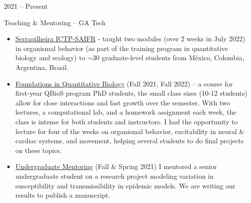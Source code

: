 \documentclass[a4paper,10pt]{article}
\newlength{\cvcolumngapwidth}
\newlength{\cvleftcolumnwidth}
\newlength{\cvrightcolumnwidth}
\newcommand{\cvtitlestyle}[1]{{\large\cvtitlefont\textcolor{cvtitlecolor}{#1}}}
\newcommand{\cvheadingstyle}[1]{{\normalsize\cvheadingfont\textcolor{cvheadingcolor}{#1}}}
\newlength{\cvafteritemskipamount}
\newlength{\cvaftertitleskipamount}
\newlength{\cvparskip}
\newcommand{\cvitem}[2]{
            \begin{minipage}[t]{\cvleftcolumnwidth}
                \raggedleft #1
            \end{minipage}%
            \hspace{\cvcolumngapwidth}%
            \begin{minipage}[t]{\cvrightcolumnwidth}
                \setlength{\parskip}{\cvparskip} #2
            \end{minipage}
        
            \vspace{\cvafteritemskipamount}
        }
\newcommand{\cvtitle}[1]{
            \cvtitlestyle{#1}
        
            \vspace{\cvaftertitleskipamount}
            \vspace{-\cvparskip}
        }
\begin{document}
	\cvitem{
            \cvheadingstyle{2021 -- Present}
        }{
            \cvtitle{Teaching \& Mentoring -- GA Tech}
            \begin{itemize}[leftmargin=*]
            	\item \href{https://docs.google.com/spreadsheets/d/1vShFs_Td_geBw8N3Ll6b7dOMDl3bdHjoqBhE8TupWd4/edit?usp=sharing}{\underline{Serrapilheira ICTP-SAIFR}} -  taught two modules (over 2 weeks in July 2022) in organismal behavior (as part of the training program in quantitative biology and ecology) to $\sim$30 graduate-level students from M\'exico, Colombia, Argentina, Brasil.
                \item \underline{Foundations in Quantitative Biology} (Fall 2021, Fall 2022) -- a course for first-year QBioS program PhD students, the small class sizes (10-12 students) allow for close interactions and fast growth over the semester. With two lectures, a computational lab, and a homework assignment each week, the class is intense for both students and instructors. I had the opportunity to lecture for four of the weeks on organismal behavior, excitability in neural \& cardiac systems, and movement, helping several students to do final projects on these topics.
		\item  \underline{Undergraduate Mentoring} (Fall \& Spring 2021) I mentored a senior undergraduate student on a research project modeling variation in susceptibility and transmissibility in epidemic models. We are writing our results to publish a manuscript. 
		\end{itemize}
        }    	
        
\end{document}
